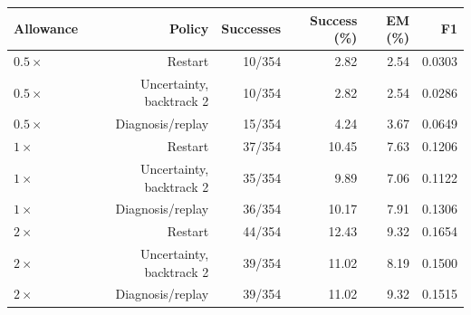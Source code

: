 \begin{tabular}{@{}lrrrrr@{}}
\toprule
Allowance & Policy & Successes & Success (\%) & EM (\%) & F1 \\
\midrule
$0.5\times$ & Restart & 10/354 & 2.82 & 2.54 & 0.0303 \\
$0.5\times$ & Uncertainty, backtrack 2 & 10/354 & 2.82 & 2.54 & 0.0286 \\
$0.5\times$ & Diagnosis/replay & 15/354 & 4.24 & 3.67 & 0.0649 \\
$1\times$ & Restart & 37/354 & 10.45 & 7.63 & 0.1206 \\
$1\times$ & Uncertainty, backtrack 2 & 35/354 & 9.89 & 7.06 & 0.1122 \\
$1\times$ & Diagnosis/replay & 36/354 & 10.17 & 7.91 & 0.1306 \\
$2\times$ & Restart & 44/354 & 12.43 & 9.32 & 0.1654 \\
$2\times$ & Uncertainty, backtrack 2 & 39/354 & 11.02 & 8.19 & 0.1500 \\
$2\times$ & Diagnosis/replay & 39/354 & 11.02 & 9.32 & 0.1515 \\
\bottomrule
\end{tabular}
